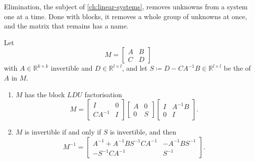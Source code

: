 Elimination, the subject of \cref{ch:linear-systems}, removes unknowns from a system one at a time. Done with blocks, it removes a whole group of unknowns at once, and the matrix that remains has a name.

\begin{theorem}
\label{thm:schur-complement}
Let
\[
M=\begin{bmatrix}A&B\\C&D\end{bmatrix}
\]
with $A\in\mathbb R^{k\times k}$ invertible and $D\in\mathbb R^{l\times l}$, and let $S\coloneqq D-CA^{-1}B\in\mathbb R^{l\times l}$ be the  of $A$ in $M$.
\begin{enumerate}
\item $M$ has the block $LDU$ factorisation
\[
M=\begin{bmatrix}I&0\\CA^{-1}&I\end{bmatrix}\begin{bmatrix}A&0\\0&S\end{bmatrix}\begin{bmatrix}I&A^{-1}B\\0&I\end{bmatrix}.
\]
\item $M$ is invertible if and only if $S$ is invertible, and then
\[
M^{-1}=\begin{bmatrix}A^{-1}+A^{-1}BS^{-1}CA^{-1}&-A^{-1}BS^{-1}\\-S^{-1}CA^{-1}&S^{-1}\end{bmatrix}.
\]
\end{enumerate}
\end{theorem}

